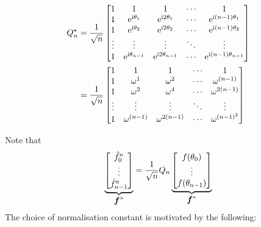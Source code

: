 \begin{definition}[DFT]
\begin{align*}
Q_n^\ensuremath{\star} &= {1 \over \sqrt{n}} \begin{bmatrix}
1 & 1 & 1&  \ensuremath{\cdots} & 1 \\
1 & {\rm e}^{{\rm i} \ensuremath{\theta}_1} & {\rm e}^{{\rm i} 2 \ensuremath{\theta}_1} & \ensuremath{\cdots} & {\rm e}^{{\rm i} (n-1) \ensuremath{\theta}_1} \\
1 &  {\rm e}^{{\rm i} \ensuremath{\theta}_2}  & {\rm e}^{{\rm i} 2 \ensuremath{\theta}_2} & \ensuremath{\cdots} & {\rm e}^{{\rm i} (n-1)\ensuremath{\theta}_2} \\
\ensuremath{\vdots} & \ensuremath{\vdots} & \ensuremath{\vdots} & \ensuremath{\ddots} & \ensuremath{\vdots} \\
1 & {\rm e}^{{\rm i} \ensuremath{\theta}_{n-1}} & {\rm e}^{{\rm i} 2 \ensuremath{\theta}_{n-1}} & \ensuremath{\cdots} & {\rm e}^{{\rm i} (n-1) \ensuremath{\theta}_{n-1}}
\end{bmatrix} \\
&= {1 \over \sqrt{n}} \begin{bmatrix}
1 & 1 & 1&  \ensuremath{\cdots} & 1 \\
1 & \ensuremath{\omega}^{1} & \ensuremath{\omega}^{2} & \ensuremath{\cdots} & \ensuremath{\omega}^{(n-1)}\\
1 & \ensuremath{\omega}^{2} & \ensuremath{\omega}^{4} & \ensuremath{\cdots} & \ensuremath{\omega}^{2(n-1)}\\
\ensuremath{\vdots} & \ensuremath{\vdots} & \ensuremath{\vdots} & \ensuremath{\ddots} & \ensuremath{\vdots} \\
1 & \ensuremath{\omega}^{(n-1)} & \ensuremath{\omega}^{2(n-1)} & \ensuremath{\cdots} & \ensuremath{\omega}^{(n-1)^2}
\end{bmatrix}
\end{align*}
\end{definition}

Note that
\[
\underbrace{\begin{bmatrix} \hat f_0^n \\ \vdots \\ \hat f_{n-1}^n \end{bmatrix}}_{{\mbox{\boldmath$f$\unboldmath}}^n} =
{1 \over \sqrt{n}} Q_n \underbrace{\begin{bmatrix} f(\theta_0) \\ \vdots \\ f(\theta_{n-1}) \end{bmatrix}}_{\bm{{\mbox{\boldmath$f$\unboldmath}}}^n}
\]
The choice of normalisation constant is motivated by the following:

